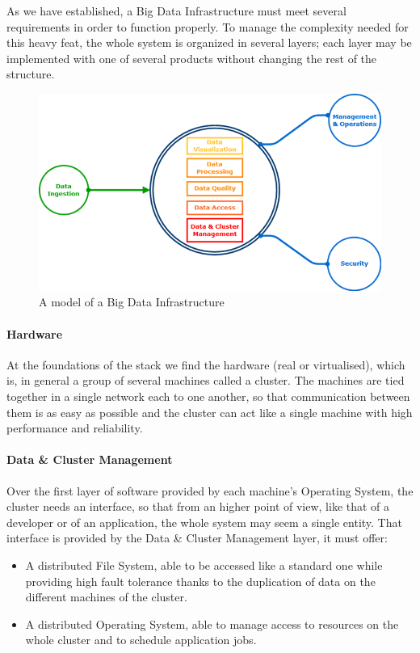As we have established, a Big Data Infrastructure must meet several requirements in order to function properly. 
To manage the complexity needed for this heavy feat, the whole system is organized in several layers; each layer may be implemented with one of several products without changing the rest of the structure.

\begin{figure}
	\centering
	\includegraphics[scale=0.8]{Figures/stack_infrastructure.png}
	\decoRule
	\caption[Infrastructural Stack]{A model of a Big Data Infrastructure}
	\label{fig:InfrastructuralStack}
\end{figure}

\paragraph{Hardware}

At the foundations of the stack we find the hardware (real or virtualised), which is, in general a group of several machines called a cluster.\newline
The machines are tied together in a single network each to one another, so that communication between them is as easy as possible and the cluster can act like a single machine with high performance and reliability.

\paragraph{Data \& Cluster Management}

Over the first layer of software provided by each machine's Operating System, the cluster needs an interface, so that from an higher point of view, like that of a developer or of an application, the whole system may seem a single entity. \newline
That interface is provided by the Data \& Cluster Management layer, it must offer: 
\begin{itemize}
	\item A distributed File System, able to be accessed like a standard one while providing high fault tolerance thanks to the duplication of data on the different machines of the cluster.
	\item A distributed Operating System, able to manage access to resources on the whole cluster and to schedule application jobs.
\end{itemize}

